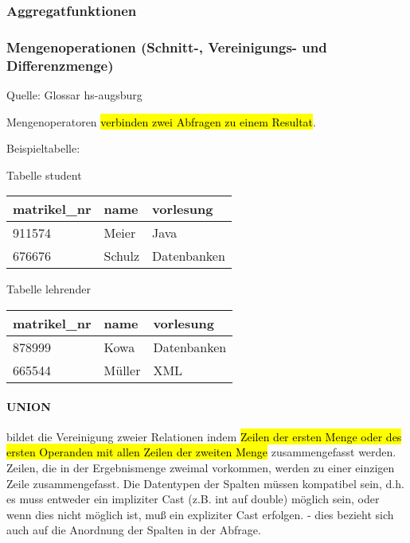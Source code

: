 \subsubsection{Aggregatfunktionen}
\label{sec:Aggregatfunktionen}

\subsubsection{Mengenoperationen (Schnitt-, Vereinigungs- und Differenzmenge)}
\label{sec:Mengenoperationen}

Quelle: Glossar hs-augsburg \cite{mengenoperationHsaugsburg}

Mengenoperatoren \hl{verbinden zwei Abfragen zu einem Resultat}.

Beispieltabelle: \\

\begin{minipage}{0.45\textwidth}
	\begin{center}
		Tabelle student \\
		\vspace{1em}
		\bgroup
		\setlength{\tabcolsep}{1em}
		\def\arraystretch{1.5}
		\begin{tabular}{l l l}
			\rowcolor{tableLightGray}matrikel\_nr & name & vorlesung \\
			\hline
			911574 & Meier & Java \\
			676676 & Schulz & Datenbanken
		\end{tabular}
		\egroup
	\end{center}
\end{minipage}
\hfill
\begin{minipage}{0.45\textwidth}
	\begin{center}
		Tabelle lehrender \\
		\vspace{1em}
		\bgroup
		\setlength{\tabcolsep}{1em}
		\def\arraystretch{1.5}
		\begin{tabular}{l l l}
			\rowcolor{tableLightGray}matrikel\_nr & name & vorlesung \\
			\hline
			878999 & Kowa & Datenbanken \\
			665544 & Müller & XML
		\end{tabular}
		\egroup
	\end{center}
\end{minipage}


\paragraph{UNION} bildet die Vereinigung zweier Relationen indem \hl{Zeilen der ersten Menge oder des ersten Operanden mit allen Zeilen der zweiten Menge} zusammengefasst werden. Zeilen, die in der Ergebnismenge zweimal vorkommen, werden zu einer einzigen Zeile zusammengefasst. Die Datentypen der Spalten müssen kompatibel sein, d.h. es muss entweder ein impliziter Cast (z.B. int auf double) möglich sein, oder wenn dies nicht möglich ist, muß ein expliziter Cast erfolgen. - dies bezieht sich auch auf die Anordnung der Spalten in der Abfrage.


